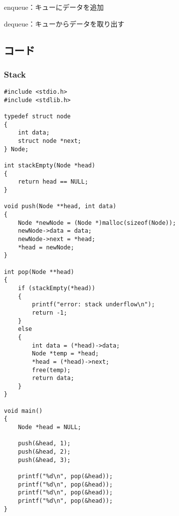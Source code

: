 \documentclass{ltjsarticle}
\begin{document}
\noindent enqueue：キューにデータを追加

\noindent dequeue：キューからデータを取り出す

\subsection{コード}
\subsubsection{Stack}
\begin{lstlisting}[frame=single, lineskip=-5pt]
#include <stdio.h>
#include <stdlib.h>

typedef struct node
{
    int data;
    struct node *next;
} Node;

int stackEmpty(Node *head)
{
    return head == NULL;
}

void push(Node **head, int data)
{
    Node *newNode = (Node *)malloc(sizeof(Node));
    newNode->data = data;
    newNode->next = *head;
    *head = newNode;
}

int pop(Node **head)
{
    if (stackEmpty(*head))
    {
        printf("error: stack underflow\n");
        return -1;
    }
    else
    {
        int data = (*head)->data;
        Node *temp = *head;
        *head = (*head)->next;
        free(temp);
        return data;
    }
}

void main()
{
    Node *head = NULL;

    push(&head, 1);
    push(&head, 2);
    push(&head, 3);

    printf("%d\n", pop(&head));
    printf("%d\n", pop(&head));
    printf("%d\n", pop(&head));
    printf("%d\n", pop(&head));
}
\end{lstlisting}
\end{document}
